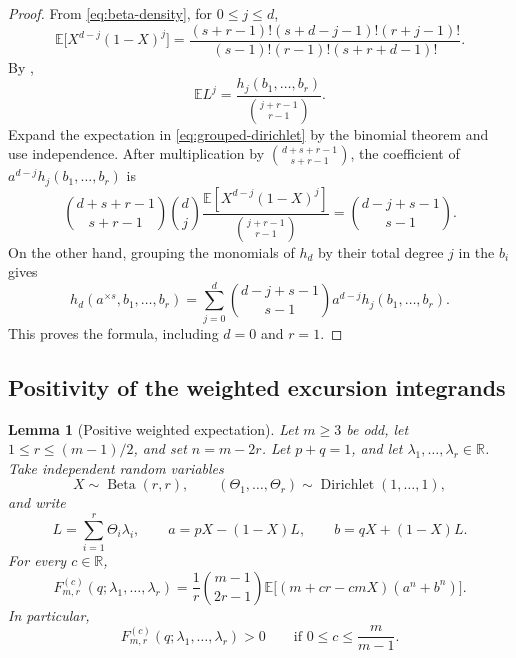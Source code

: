 \documentclass[11pt]{article}
\newtheorem{lemma}[theorem]{Lemma}
\numberwithin{equation}{section}
\newcommand{\R}{\mathbb R}
\newcommand{\E}{\mathbb E}
\newcommand{\BetaLaw}{\operatorname{Beta}}
\begin{document}
\begin{proof}
  From \eqref{eq:beta-density}, for $0\le j\le d$,
  \[
    \E\bigl[X^{d-j}(1-X)^j\bigr]
      =\frac{(s+r-1)!(s+d-j-1)!(r+j-1)!}
       {(s-1)!(r-1)!(s+r+d-1)!}.
  \]
  By ,
  \[
    \E L^j=\frac{h_j(b_1,\ldots,b_r)}{\binom{j+r-1}{r-1}}.
  \]
  Expand the expectation in \eqref{eq:grouped-dirichlet} by the
  binomial theorem and use independence. After multiplication by
  $\binom{d+s+r-1}{s+r-1}$, the coefficient of
  $a^{d-j}h_j(b_1,\ldots,b_r)$ is
  \[
    \binom{d+s+r-1}{s+r-1}\binom dj
    \frac{\E[X^{d-j}(1-X)^j]}{\binom{j+r-1}{r-1}}
       =\binom{d-j+s-1}{s-1}.
  \]
  On the other hand, grouping the monomials of $h_d$ by their total
  degree $j$ in the $b_i$ gives
  \[
    h_d(a^{\times s},b_1,\ldots,b_r)
      =\sum_{j=0}^d\binom{d-j+s-1}{s-1}
         a^{d-j}h_j(b_1,\ldots,b_r).
  \]
  This proves the formula, including $d=0$ and $r=1$.
\end{proof}

\subsection{Positivity of the weighted excursion integrands}

\begin{lemma}[Positive weighted expectation]
\label{lem:weighted-positivity}
  Let $m\ge3$ be odd, let $1\le r\le(m-1)/2$, and set $n=m-2r$.
  Let $p+q=1$, and let $\lambda_1,\ldots,\lambda_r\in\R$.
  Take independent random variables
  \[
    X\sim\BetaLaw(r,r),\qquad
    (\Theta_1,\ldots,\Theta_r)
       \sim\operatorname{Dirichlet}(1,\ldots,1),
  \]
  and write
  \[
    L=\sum_{i=1}^r\Theta_i\lambda_i,\qquad
    a=pX-(1-X)L,\qquad b=qX+(1-X)L.
  \]
  For every $c\in\R$,
  \begin{equation}\label{eq:weighted-positive-expectation}
    F^{(c)}_{m,r}(q;\lambda_1,\ldots,\lambda_r)
      =\frac1r\binom{m-1}{2r-1}
       \E\bigl[(m+cr-cmX)(a^n+b^n)\bigr].
  \end{equation}
  In particular,
  \begin{equation}\label{eq:weighted-pointwise-positive}
    F^{(c)}_{m,r}(q;\lambda_1,\ldots,\lambda_r)>0
       \qquad\text{if }0\le c\le\frac{m}{m-1}.
  \end{equation}
\end{lemma}
\end{document}
